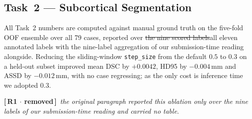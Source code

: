 \documentclass[runningheads]{llncs}
\newcommand{\addone}[1]{\textcolor{revone}{#1}}
\newcommand{\delone}[1]{\textcolor{revone}{\sout{#1}}}
\newcommand{\noteone}[1]{{\color{revone}\small\textbf{[\,R1 $\cdot$ removed\,]}\ \textit{#1}\par}}
\begin{document}
\subsection{Task~2 --- Subcortical Segmentation}
\label{sec:r2}

All Task~2 numbers are computed against manual ground truth on the five-fold OOF
ensemble over all 79 cases, reported over \delone{the nine scored
labels}\addone{all eleven annotated labels with the nine-label aggregation of our
submission-time reading alongside}. Reducing the
sliding-window \texttt{step\_size} from the default $0.5$ to $0.3$ on a held-out
subset improved mean DSC by $+0.0042$, HD95 by $-0.004$\,mm and ASSD by
$-0.012$\,mm, with no case regressing; as the only cost is inference time we
adopted $0.3$.

\noteone{the original paragraph reported this ablation only over the
nine labels of our submission-time reading and carried no table.}
\end{document}

